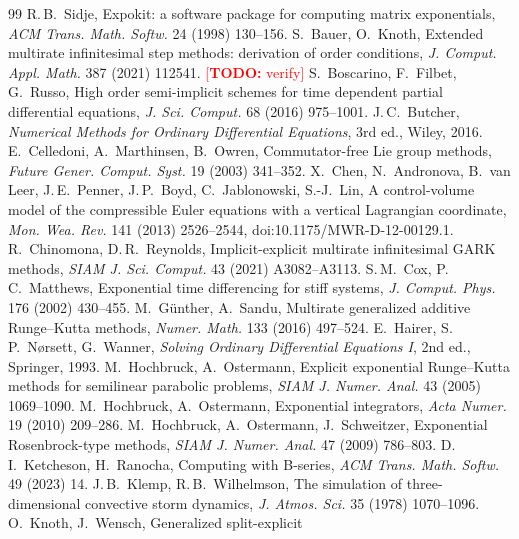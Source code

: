 \documentclass[11pt,a4paper]{article}
\theoremstyle{definition}
\theoremstyle{remark}
\newcommand{\todo}[1]{\textcolor{red}{[\textbf{TODO:} #1]}}
\begin{document}
\begin{thebibliography}{99}
 R.\,B.~Sidje, Expokit: a software package for
 computing matrix exponentials, \emph{ACM Trans. Math. Softw.} 24 (1998)
 130--156.
 S.~Bauer, O.~Knoth,
 Extended multirate infinitesimal step methods: derivation of order
 conditions, \emph{J. Comput. Appl. Math.} 387 (2021) 112541.
 \todo{verify}
 S.~Boscarino, F.~Filbet, G.~Russo,
 High order semi-implicit schemes for time dependent partial differential
 equations, \emph{J. Sci. Comput.} 68 (2016) 975--1001.
 J.\,C.~Butcher, \emph{Numerical Methods for
 Ordinary Differential Equations}, 3rd ed., Wiley, 2016.
 E.~Celledoni, A.~Marthinsen,
 B.~Owren, Commutator-free Lie group methods, \emph{Future Gener. Comput.
 Syst.} 19 (2003) 341--352.
 X.~Chen, N.~Andronova, B.~van Leer, J.\,E.~Penner,
 J.\,P.~Boyd, C.~Jablonowski, S.-J.~Lin, A control-volume model of the
 compressible Euler equations with a vertical Lagrangian coordinate,
 \emph{Mon. Wea. Rev.} 141 (2013) 2526--2544, doi:10.1175/MWR-D-12-00129.1.
 R.~Chinomona, D.\,R.~Reynolds,
 Implicit-explicit multirate infinitesimal GARK methods, \emph{SIAM J.
 Sci. Comput.} 43 (2021) A3082--A3113.
 S.\,M.~Cox, P.\,C.~Matthews, Exponential time
 differencing for stiff systems, \emph{J. Comput. Phys.} 176 (2002)
 430--455.
 M.~G\"unther, A.~Sandu, Multirate generalized
 additive Runge--Kutta methods, \emph{Numer. Math.} 133 (2016) 497--524.
 E.~Hairer, S.\,P.~N{\o}rsett,
 G.~Wanner, \emph{Solving Ordinary Differential Equations I}, 2nd ed.,
 Springer, 1993.
 M.~Hochbruck, A.~Ostermann, Explicit
 exponential Runge--Kutta methods for semilinear parabolic problems,
 \emph{SIAM J. Numer. Anal.} 43 (2005) 1069--1090.
 M.~Hochbruck, A.~Ostermann, Exponential
 integrators, \emph{Acta Numer.} 19 (2010) 209--286.
 M.~Hochbruck, A.~Ostermann,
 J.~Schweitzer, Exponential Rosenbrock-type methods, \emph{SIAM J. Numer.
 Anal.} 47 (2009) 786--803.
 D.\,I.~Ketcheson, H.~Ranocha, Computing
 with B-series, \emph{ACM Trans. Math. Softw.} 49 (2023) 14.
 J.\,B.~Klemp, R.\,B.~Wilhelmson, The
 simulation of three-dimensional convective storm dynamics, \emph{J.
 Atmos. Sci.} 35 (1978) 1070--1096.
 O.~Knoth, J.~Wensch, Generalized split-explicit

\end{thebibliography}
\end{document}
